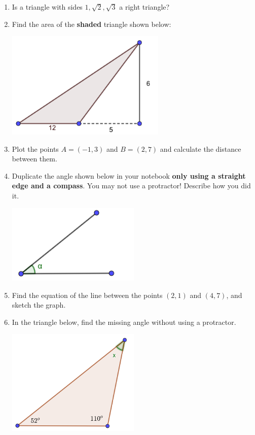\documentclass[12pt]{article}
\begin{document}
\begin{enumerate}
\item Is a triangle with sides $1, \sqrt{2}, \sqrt{3}$ a right triangle?

\item Find the area of the \textbf{shaded} triangle shown below:

\includegraphics[width=3in]{area-triangle-1.png}

\item Plot the points $A=(-1, 3)$ and $B=(2, 7)$ and calculate the distance between them.

\item Duplicate the angle shown below in your notebook \textbf{only using a straight edge and a compass}.  You may not use a protractor!  Describe how you did it.

\includegraphics[width=2.5in]{angle-1.png}

\item Find the equation of the line between the points $(2, 1)$ and $(4, 7)$, and sketch the graph.

\pagebreak
\item In the triangle below, find the missing angle without using a protractor.

\includegraphics[width=2.5in]{triangle-solve-angle-1.png}


\end{enumerate}
\end{document}
